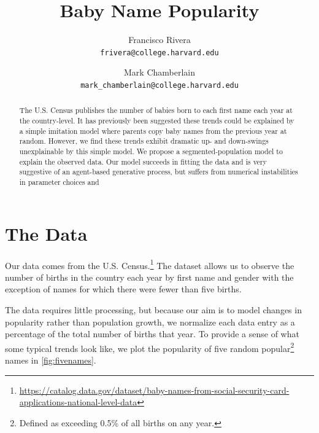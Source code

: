 \documentclass[a4paper]{article}
\begin{document}
\title{Baby Name Popularity}
\author{
Francisco Rivera \\ \texttt{frivera@college.harvard.edu}
\and
Mark Chamberlain \\ \texttt{mark\_chamberlain@college.harvard.edu}}

\maketitle

\begin{abstract}

The U.S. Census publishes the number of babies born to each first name each year
at the country-level. It has previously \citep{hahn2003drift} been suggested
these trends could be explained by a simple imitation model where parents copy
baby names from the previous year at random. However, we find these trends
exhibit dramatic up- and down-swings unexplainable by this simple model. We
propose a segmented-population model to explain the observed data. Our model
succeeds in fitting the data and is very suggestive of an agent-based generative
process, but suffers from numerical instabilities in parameter choices and 

\end{abstract}

\section{The Data}

Our data comes from the U.S.
Census.\footnote{\url{https://catalog.data.gov/dataset/baby-names-from-social-security-card-applications-national-level-data}}
The dataset allows us to observe the number of births in the country each year
by first name and gender with the exception of names for which there were fewer
than five births.

The data requires little processing, but because our aim is to model changes in
popularity rather than population growth, we normalize each data entry as a
percentage of the total number of births that year. To provide a sense of what
some typical trends look like, we plot the popularity of five random
popular\footnote{Defined as exceeding 0.5\% of all births on any year.} names in
\cref{fig:fivenames}.
\end{document}
